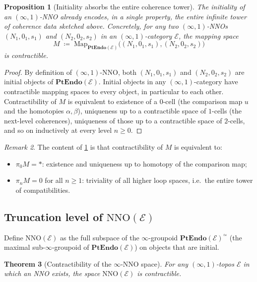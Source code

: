 \documentclass[12pt]{article}
\newtheorem{theorem}{Theorem}[section]
\newtheorem{proposition}[theorem]{Proposition}
\theoremstyle{definition}
\theoremstyle{remark}
\newtheorem{remark}[theorem]{Remark}
\newcommand{\Map}{\mathrm{Map}}
\newcommand{\PtEndo}{\mathbf{PtEndo}}
\newcommand{\eqv}{\simeq}
\begin{document}
\begin{proposition}[Initiality absorbs the entire coherence tower]\label{prop:tower}
The initiality of an $(\infty,1)$-NNO already encodes, in a single property, the entire infinite tower of coherence data sketched above. Concretely, for any two $(\infty,1)$-NNOs $(N_{1},0_{1},s_{1})$ and $(N_{2},0_{2},s_{2})$ in an $(\infty,1)$-category $\mathcal{E}$, the mapping space
\[
M \;\coloneqq\; \Map_{\PtEndo(\mathcal{E})}\bigl((N_{1},0_{1},s_{1}),(N_{2},0_{2},s_{2})\bigr)
\]
is contractible.
\end{proposition}

\begin{proof}
By definition of $(\infty,1)$-NNO, both $(N_{1},0_{1},s_{1})$ and $(N_{2},0_{2},s_{2})$ are initial objects of $\PtEndo(\mathcal{E})$. Initial objects in any $(\infty,1)$-category have contractible mapping spaces to every object, in particular to each other. Contractibility of $M$ is equivalent to existence of a $0$-cell (the comparison map $u$ and the homotopies $\alpha,\beta$), uniqueness up to a contractible space of $1$-cells (the next-level coherences), uniqueness of those up to a contractible space of $2$-cells, and so on inductively at every level $n\geq 0$.
\end{proof}

\begin{remark}
The content of \cref{prop:tower} is that contractibility of $M$ is equivalent to:
\begin{itemize}
  \item $\pi_{0}M = *$: existence and uniqueness up to homotopy of the comparison map;
  \item $\pi_{n}M = 0$ for all $n\geq 1$: triviality of all higher loop spaces, i.e.\ the entire tower of compatibilities.
\end{itemize}
\end{remark}

\subsection{Truncation level of \texorpdfstring{$\mathrm{NNO}(\mathcal{E})$}{NNO(E)}}

Define $\mathrm{NNO}(\mathcal{E})$ as the full subspace of the $\infty$-groupoid $\PtEndo(\mathcal{E})^{\eqv}$ (the maximal sub-$\infty$-groupoid of $\PtEndo(\mathcal{E})$) on objects that are initial.

\begin{theorem}[Contractibility of the $\infty$-NNO space]\label{thm:contractibility-infty}
For any $(\infty,1)$-topos $\mathcal{E}$ in which an NNO exists, the space $\mathrm{NNO}(\mathcal{E})$ is contractible.
\end{theorem}
\end{document}
